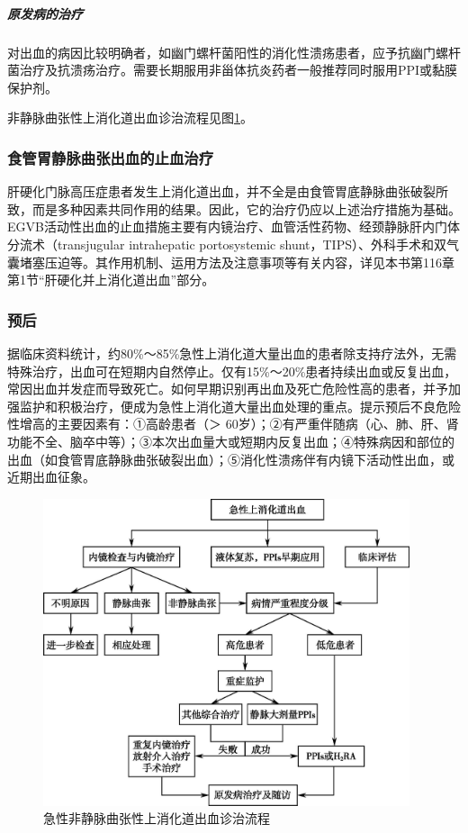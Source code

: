 \subparagraph{原发病的治疗}

对出血的病因比较明确者，如幽门螺杆菌阳性的消化性溃疡患者，应予抗幽门螺杆菌治疗及抗溃疡治疗。需要长期服用非甾体抗炎药者一般推荐同时服用PPI或黏膜保护剂。

非静脉曲张性上消化道出血诊治流程见图\ref{fig13-1}。

\subsubsection{食管胃静脉曲张出血的止血治疗}

肝硬化门脉高压症患者发生上消化道出血，并不全是由食管胃底静脉曲张破裂所致，而是多种因素共同作用的结果。因此，它的治疗仍应以上述治疗措施为基础。EGVB活动性出血的止血措施主要有内镜治疗、血管活性药物、经颈静脉肝内门体分流术（transjugular
intrahepatic portosystemic
shunt，TIPS）、外科手术和双气囊堵塞压迫等。其作用机制、运用方法及注意事项等有关内容，详见本书第116章第1节“肝硬化并上消化道出血”部分。

\subsubsection{预后}

据临床资料统计，约80\%～85\%急性上消化道大量出血的患者除支持疗法外，无需特殊治疗，出血可在短期内自然停止。仅有15\%～20\%患者持续出血或反复出血，常因出血并发症而导致死亡。如何早期识别再出血及死亡危险性高的患者，并予加强监护和积极治疗，便成为急性上消化道大量出血处理的重点。提示预后不良危险性增高的主要因素有：①高龄患者（＞
60岁）；②有严重伴随病（心、肺、肝、肾功能不全、脑卒中等）；③本次出血量大或短期内反复出血；④特殊病因和部位的出血（如食管胃底静脉曲张破裂出血）；⑤消化性溃疡伴有内镜下活动性出血，或近期出血征象。

\begin{figure}[!htbp]
 \centering
 \includegraphics[width=4.23958in,height=3.55208in]{./images/Image00058.jpg}
 \captionsetup{justification=centering}
 \caption{急性非静脉曲张性上消化道出血诊治流程}
 \label{fig13-1}
  \end{figure} 

